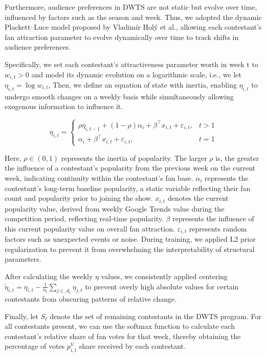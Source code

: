 \documentclass[12pt]{article}
\begin{document}
Furthermore, audience preferences in DWTS are not static but evolve over time, influenced by factors such as the season and week. Thus, we adopted the dynamic Plackett–Luce model proposed by Vladimír Holý et al., allowing each contestant's fan attraction parameter to evolve dynamically over time to track shifts in audience preferences.

Specifically, we set each contestant's attractiveness parameter worth in week t to $w_{i,t} > 0$ and model its dynamic evolution on a logarithmic scale, i.e., we let $\eta_{i,t} = \log w_{i,t}$, Then, we define an equation of state with inertia, enabling $\eta_{i,t}$ to undergo smooth changes on a weekly basis while simultaneously allowing exogenous information to influence it.

\begin{equation}
  \eta_{i,t} =
  \begin{cases}
    \rho \eta_{i,t-1} + (1 - \rho)\alpha_i + \beta^{\top} x_{i,t} + \varepsilon_{i,t}, & t > 1 \\
    \alpha_i + \beta^{\top} x_{i,t} + \varepsilon_{i,t}, & t = 1
  \end{cases}
\end{equation}

Here, $\rho \in (0,1)$ represents the inertia of popularity. The larger $\rho$ is, the greater the influence of a contestant's popularity from the previous week on the current week, indicating continuity within the contestant's fan base. $\alpha_i$ represents the contestant's long-term baseline popularity, a static variable reflecting their fan count and popularity prior to joining the show. $x_{i,t}$ denotes the current popularity value, derived from weekly Google Trends value during the competition period, reflecting real-time popularity. $\beta$ represents the influence of this current popularity value on overall fan attraction. $\varepsilon_{i,t}$ represents random factors such as unexpected events or noise. During training, we applied L2 prior regularization to prevent it from overwhelming the interpretability of structural parameters.

After calculating the weekly $\eta$ values, we consistently applied centering $\tilde{\eta}_{i,t} = \eta_{i,t} - \frac{1}{n_t} \sum_{j \in \mathcal{A}_t} \eta_{j,t} $ to prevent overly high absolute values for certain contestants from obscuring patterns of relative change.

Finally, let $S_t$ denote the set of remaining contestants in the DWTS program. For all contestants present, we can use the softmax function to calculate each contestant's relative share of fan votes for that week, thereby obtaining the percentage of votes $p_{i,t}^V$ share received by each contestant.
\end{document}
